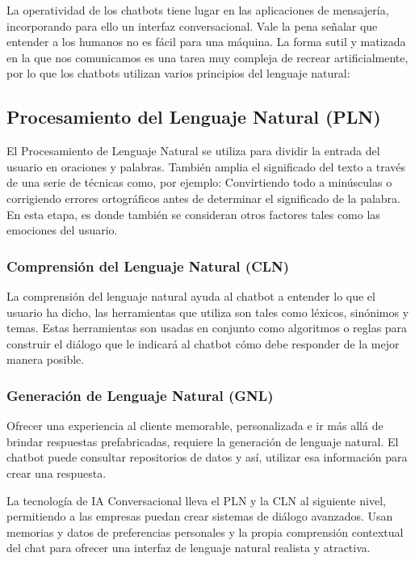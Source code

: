 La operatividad de los chatbots tiene lugar en las aplicaciones de mensajería, incorporando para ello un interfaz conversacional.
Vale la pena señalar que entender a los humanos no es fácil para una máquina. La forma sutil y matizada en la que nos comunicamos es una tarea muy compleja de recrear artificialmente, por lo que los chatbots utilizan varios principios del lenguaje natural:

\subsection{Procesamiento del Lenguaje Natural (PLN)}

El Procesamiento de Lenguaje Natural se utiliza para dividir la entrada del usuario en oraciones y palabras. También amplia el significado del texto a través de una serie de técnicas como, por ejemplo: Convirtiendo todo a minúsculas o corrigiendo errores ortográficos antes de determinar el significado de la palabra. En esta etapa, es donde también se consideran otros factores tales como las emociones del usuario.

\subsubsection{Comprensión del Lenguaje Natural (CLN)}

La comprensión del lenguaje natural ayuda al chatbot a entender lo que el usuario ha dicho, las herramientas que utiliza son tales como léxicos, sinónimos y temas. Estas herramientas son usadas en conjunto como algoritmos o reglas para construir el diálogo que le indicará al chatbot cómo debe responder de la mejor manera posible.

\subsubsection{Generación de Lenguaje Natural (GNL)}

Ofrecer una experiencia al cliente memorable, personalizada e ir más allá de brindar respuestas prefabricadas, requiere la generación de lenguaje natural. El chatbot puede consultar repositorios de datos y así, utilizar esa información para crear una respuesta.

La tecnología de IA Conversacional lleva el PLN y la CLN al siguiente nivel, permitiendo a las empresas puedan crear sistemas de diálogo avanzados.
Usan memorias y datos de preferencias personales y la propia comprensión contextual del chat para ofrecer una interfaz de lenguaje natural realista y atractiva.

